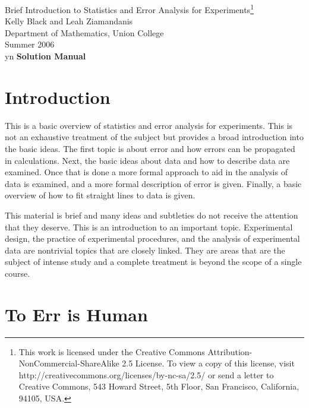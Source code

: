 \documentclass[12pt]{article}
\def\solutions{y}
\def\solutions{n}
\begin{document}
\begin{center}
  {\Large Brief Introduction to Statistics and Error Analysis
    for Experiments\footnote{
                 This work is licensed under the Creative Commons 
		 Attribution-NonCommercial-ShareAlike 2.5 License. 
		 To view a copy of this license, visit 
		 http://creativecommons.org/licenses/by-nc-sa/2.5/ 
		 or send a letter to Creative Commons, 543 Howard Street, 
		 5th Floor, San Francisco, California, 94105, USA.}} \\
  Kelly Black and Leah Ziamandanis \\
  Department of Mathematics, Union College \\
  Summer 2006 \\
\if y\solutions
\textbf{Solution Manual}
\fi
\end{center}



\tableofcontents




\clearpage

\section{Introduction}

This is a basic overview of statistics and error analysis for
experiments. This is not an exhaustive treatment of the subject but
provides a broad introduction into the basic ideas. The first topic is
about error and how errors can be propagated in calculations.  Next,
the basic ideas about data and how to describe data are examined. Once
that is done a more formal approach to aid in the analysis of data is
examined, and a more formal description of error is given.  Finally, a
basic overview of how to fit straight lines to data is given.

This material is brief and many ideas and subtleties do not receive
the attention that they deserve. This is an introduction to an
important topic.  Experimental design, the practice of experimental
procedures, and the analysis of experimental data are nontrivial
topics that are closely linked. They are areas that are the subject of
intense study and a complete treatment is beyond the scope of a single
course.



\section{To Err is Human}
\end{document}
